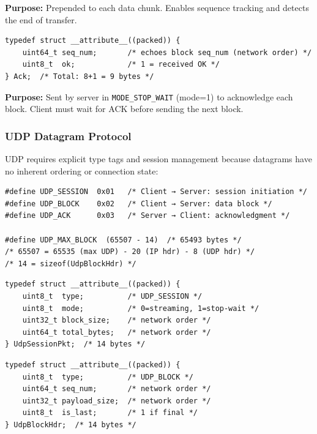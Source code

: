 \documentclass[12pt,a4paper]{article}
\begin{document}
\textbf{Purpose:} Prepended to each data chunk. Enables sequence tracking and detects the end of transfer.

\vspace{0.3cm}

\begin{lstlisting}[caption=Ack Structure (9 bytes) – Stop-and-Wait Mode Only,label=lst:ack]
typedef struct __attribute__((packed)) {
    uint64_t seq_num;       /* echoes block seq_num (network order) */
    uint8_t  ok;            /* 1 = received OK */
} Ack;  /* Total: 8+1 = 9 bytes */
\end{lstlisting}

\textbf{Purpose:} Sent by server in \texttt{MODE\_STOP\_WAIT} (mode=1) to acknowledge each block. Client must wait for ACK before sending the next block.

\subsubsection{UDP Datagram Protocol}

UDP requires explicit type tags and session management because datagrams have no inherent ordering or connection state:

\begin{lstlisting}[caption=UDP Message Types,label=lst:udp_types]
#define UDP_SESSION  0x01   /* Client → Server: session initiation */
#define UDP_BLOCK    0x02   /* Client → Server: data block */
#define UDP_ACK      0x03   /* Server → Client: acknowledgment */

#define UDP_MAX_BLOCK  (65507 - 14)  /* 65493 bytes */
/* 65507 = 65535 (max UDP) - 20 (IP hdr) - 8 (UDP hdr) */
/* 14 = sizeof(UdpBlockHdr) */
\end{lstlisting}

\begin{lstlisting}[caption=UdpSessionPkt (14 bytes),label=lst:udpsessionpkt]
typedef struct __attribute__((packed)) {
    uint8_t  type;          /* UDP_SESSION */
    uint8_t  mode;          /* 0=streaming, 1=stop-wait */
    uint32_t block_size;    /* network order */
    uint64_t total_bytes;   /* network order */
} UdpSessionPkt;  /* 14 bytes */
\end{lstlisting}

\begin{lstlisting}[caption=UdpBlockHdr (14 bytes),label=lst:udpblockhdr]
typedef struct __attribute__((packed)) {
    uint8_t  type;          /* UDP_BLOCK */
    uint64_t seq_num;       /* network order */
    uint32_t payload_size;  /* network order */
    uint8_t  is_last;       /* 1 if final */
} UdpBlockHdr;  /* 14 bytes */
\end{lstlisting}
\end{document}
